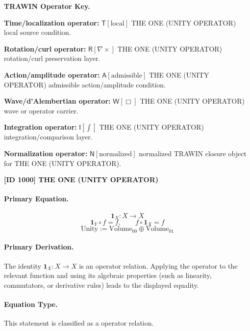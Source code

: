 \par\vspace{0.45\baselineskip}
\noindent\begin{minipage}[t]{\linewidth}
\begingroup
\small
\raggedright
\textbf{TRAWIN Operator Key.}\par
\noindent\textbf{Time/localization operator:} $\mathsf{T}\!\left[\mathrm{local}\right]$ THE ONE (UNITY OPERATOR) local source condition.\par
\noindent\textbf{Rotation/curl operator:} $\mathsf{R}\!\left[\nabla\times\right]$ THE ONE (UNITY OPERATOR) rotation/curl preservation layer.\par
\noindent\textbf{Action/amplitude operator:} $\mathsf{A}\!\left[\mathrm{admissible}\right]$ THE ONE (UNITY OPERATOR) admissible action/amplitude condition.\par
\noindent\textbf{Wave/d'Alembertian operator:} $\mathsf{W}\!\left[\Box\right]$ THE ONE (UNITY OPERATOR) wave or operator carrier.\par
\noindent\textbf{Integration operator:} $\mathsf{I}\!\left[\int\right]$ THE ONE (UNITY OPERATOR) integration/comparison layer.\par
\noindent\textbf{Normalization operator:} $\mathsf{N}\!\left[\mathrm{normalized}\right]$ normalized TRAWIN closure object for THE ONE (UNITY OPERATOR).\par
\endgroup
\end{minipage}

\clearpage
\noindent\textbf{[ID 1000] THE ONE (UNITY OPERATOR)}\par
\vspace{0.35em}
\paragraph{Primary Equation.}
\[
\mathbf{1}_{X}:X\to X
\]
\[
\mathbf{1}_{Y}\circ f=f,\qquad f\circ\mathbf{1}_{X}=f
\]
\[
\mathrm{Unity}:=\mathrm{Volume}_{00}\oplus\mathrm{Volume}_{01}
\]

\paragraph{Primary Derivation.}
The identity \( \mathbf{1}_{X}:X\to X \) is an operator relation. Applying the operator to the relevant function and using its algebraic properties (such as linearity, commutators, or derivative rules) leads to the displayed equality.
\paragraph{Equation Type.}
This statement is classified as a operator relation.

